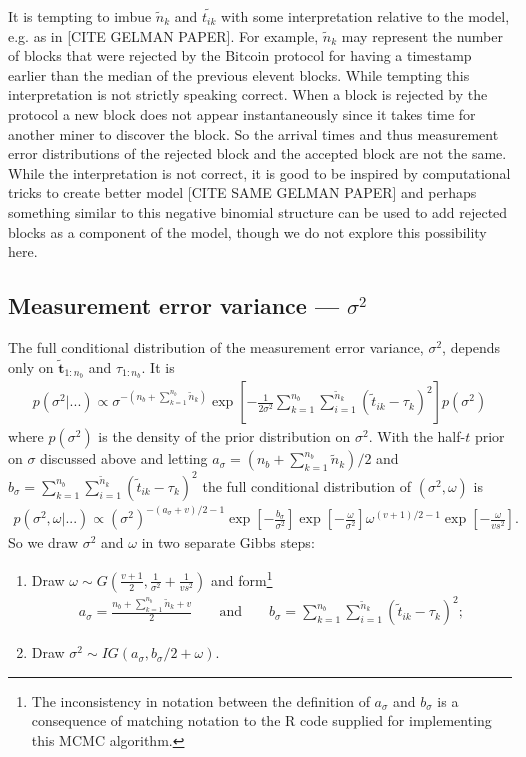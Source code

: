 \documentclass{article}
\begin{document}
It is tempting to imbue $\tilde{n}_k$ and $\tilde{t_{ik}}$ with some interpretation relative to the model, e.g. as in [CITE GELMAN PAPER]. For example, $\tilde{n}_k$ may represent the number of blocks that were rejected by the Bitcoin protocol for having a timestamp earlier than the median of the previous elevent blocks. While tempting this interpretation is not strictly speaking correct. When a block is rejected by the protocol a new block does not appear instantaneously since it takes time for another miner to discover the block. So the arrival times and thus measurement error distributions of the rejected block and the accepted block are not the same. While the interpretation is not correct, it is good to be inspired by computational tricks to create better model [CITE SAME GELMAN PAPER] and perhaps something similar to this negative binomial structure can be used to add rejected blocks as a component of the model, though we do not explore this possibility here.

\subsection{Measurement error variance --- $\sigma^2$}
The full conditional distribution of the measurement error variance, $\sigma^2$, depends only on $\tilde{\bm{t}}_{1:n_{b}}$ and $\tau_{1:n_{b}}$. It is
\begin{align*}
p(\sigma^2|...) \propto \sigma^{-(n_{b} + \sum_{k=1}^{n_{b}}\tilde{n}_k)}\exp\left[-\frac{1}{2\sigma^2}\sum_{k=1}^{n_{b}}\sum_{i=1}^{\tilde{n}_k}(\tilde{t}_{ik} - \tau_k)^2\right]p(\sigma^2)
\end{align*}
where $p(\sigma^2)$ is the density of the prior distribution on $\sigma^2$. With the half-$t$ prior on $\sigma$ discussed above and letting $a_\sigma = (n_{b} + \sum_{k=1}^{n_b}\tilde{n}_k)/2$ and $b_\sigma = \sum_{k=1}^{n_{b}}\sum_{i=1}^{\tilde{n}_k}(\tilde{t}_{ik} - \tau_k)^2$ the full conditional distribution of $(\sigma^2,\omega)$ is
\begin{align*}
p(\sigma^2,\omega|...) \propto (\sigma^2)^{-(a_\sigma+v)/2-1}\exp\left[-\frac{b_\sigma}{\sigma^2}\right]\exp\left[-\frac{\omega}{\sigma^2}\right]\omega^{(v + 1)/2 - 1}\exp\left[-\frac{\omega}{v s^2}\right].
\end{align*}
So we draw $\sigma^2$ and $\omega$ in two separate Gibbs steps:
\begin{enumerate}
\item Draw $\omega \sim G\left(\frac{v + 1}{2}, \frac{1}{\sigma^2} + \frac{1}{v s^2}\right)$ and form\footnote{The inconsistency in notation between the definition of $a_\sigma$ and $b_\sigma$ is a consequence of matching notation to the R code supplied for implementing this MCMC algorithm.}
\begin{align*}
a_\sigma = \frac{n_{b} + \sum_{k=1}^{n_b}\tilde{n}_k + v}{2} &&\mbox{  and  }&& b_\sigma = \sum_{k=1}^{n_{b}}\sum_{i=1}^{\tilde{n}_k}(\tilde{t}_{ik} - \tau_k)^2;
\end{align*}
\item Draw $\sigma^2 \sim  IG\left(a_\sigma, b_\sigma/2 + \omega\right)$.
\end{enumerate}
\end{document}

